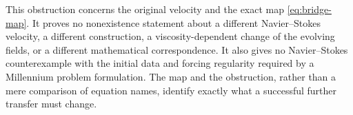 This obstruction concerns the original velocity and the exact map
\eqref{eq:bridge-map}.  It proves no nonexistence statement about a
different Navier--Stokes velocity, a different construction, a
viscosity-dependent change of the evolving fields, or a different
mathematical correspondence.  It also gives no Navier--Stokes
counterexample with the initial data and forcing regularity required
by a Millennium problem formulation.  The map and the obstruction,
rather than a mere comparison of equation names, identify exactly
what a successful further transfer must change.
